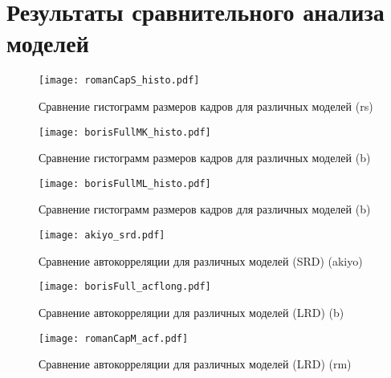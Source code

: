 \section{Результаты сравнительного анализа моделей}
\label{sec:results}

    \begin{figure}[h]
        \begin{center}
            \texttt{[image: romanCapS\_histo.pdf]}
        \end{center}
        \caption{Сравнение гистограмм размеров кадров для различных моделей (rs)}
    \end{figure}

    \begin{figure}[h]
        \begin{center}
            \texttt{[image: borisFullMK\_histo.pdf]}
        \end{center}
        \caption{Сравнение гистограмм размеров кадров для различных моделей (b)}
    \end{figure}

    \begin{figure}[h]
        \begin{center}
            \texttt{[image: borisFullML\_histo.pdf]}
        \end{center}
        \caption{Сравнение гистограмм размеров кадров для различных моделей (b)}
    \end{figure}

    \begin{figure}[h]
        \begin{center}
            \texttt{[image: akiyo\_srd.pdf]}
        \end{center}
        \caption{Сравнение автокорреляции для различных моделей (SRD) (akiyo)}
    \end{figure}

    \begin{figure}[h]
        \begin{center}
            \texttt{[image: borisFull\_acflong.pdf]}
        \end{center}
        \caption{Сравнение автокорреляции для различных моделей (LRD) (b)}
    \end{figure}

    \begin{figure}[h]
        \begin{center}
            \texttt{[image: romanCapM\_acf.pdf]}
        \end{center}
        \caption{Сравнение автокорреляции для различных моделей (LRD) (rm)}
    \end{figure}

